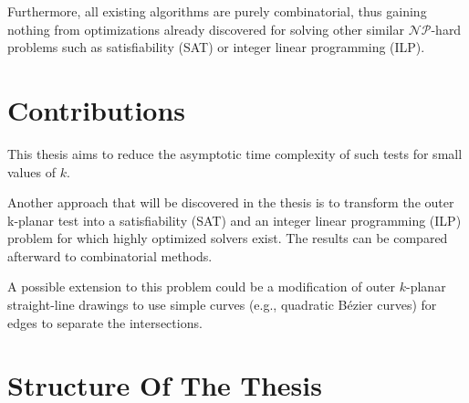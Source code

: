 Furthermore, all existing algorithms are purely combinatorial, thus gaining nothing from optimizations already discovered for solving other similar \(\mathcal{NP}\)-hard problems such as satisfiability (SAT) or integer linear programming (ILP).


\section{Contributions}

This thesis aims to reduce the asymptotic time complexity of such tests for small values of \(k\).

Another approach that will be discovered in the thesis is to transform the outer k-planar test into a satisfiability (SAT) and an integer linear programming (ILP) problem for which highly optimized solvers exist.
The results can be compared afterward to combinatorial methods.

A possible extension to this problem could be a modification of outer \(k\)-planar straight-line drawings to use simple curves (e.g., quadratic Bézier curves) for edges to separate the intersections.


\section{Structure Of The Thesis}
